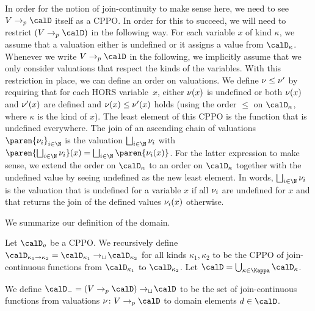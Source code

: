 \documentclass[../../diss.tex]{subfiles}
\begin{document}
In order for the notion of join-continuity to make sense here, we need to see $V \pto \domain$ itself as a CPPO.\@
In order for this to succeed, we will need to restrict $(V \pto \domain)$ in the following way.
For each variable $x$ of kind $\kappa$, we assume that a valuation either is undefined or it assigns a value from $\domain{\kappa}$.
Whenever we write $V \pto \domain$ in the following, we implicitly assume that we only consider valuations that respect the kinds of the variables.
With this restriction in place, we can define an order on valuations.
We define $\nu \leq \nu'$ by requiring that for each HORS variable~$x$, either $\nu(x)$ is undefined or both $\nu(x)$ and $\nu'(x)$ are defined and $\nu(x) \leq \nu'(x)$ holds (using the order $\leq$ on $\domain{\kappa}$, where $\kappa$ is the kind of $x$).
The least element of this CPPO is the function that is undefined everywhere.
The join of an ascending chain of valuations ${\paren{\val_i}}_{i \in \N}$ is the valuation $\bigsqcup_{i \in \N} \val_i$ with $\paren{ \bigsqcup_{i \in \N} \val_i} (x) = \bigsqcup_{i \in \N} \paren{ \val_i(x)}$.
For the latter expression to make sense, we extend the order on $\domain{\kappa}$ to an order on $\domain{\kappa}$ together with the undefined value by seeing undefined as the new least element.
In words, $\bigsqcup_{i \in \N} \val_i$ is the valuation that is undefined for a variable $x$ if all $\nu_i$ are undefined for $x$ and that returns the join of the defined values $\nu_i(x)$ otherwise.


We summarize our definition of the domain.

\begin{definition}
    Let $\domain{\ground}$ be a CPPO.\@
    We recursively define $\domain{\kappa_1 \to \kappa_2} = \domain{\kappa_1} \cto \domain{\kappa_2}$ for all kinds $\kappa_1, \kappa_2$ to be the CPPO of join-continuous functions from $\domain{\kappa_1}$ to $\domain{\kappa_2}$.
    Let \( \domain = \bigcup_{\kappa \in \kinds } \domain{\kappa} \).

    We define $\domaint = (V \pto \domain) \cto \domain$ to be the set of join-continuous functions from valuations $\val \colon V \pto \domain$ to domain elements $d \in \domain$.
\end{definition}
\end{document}
